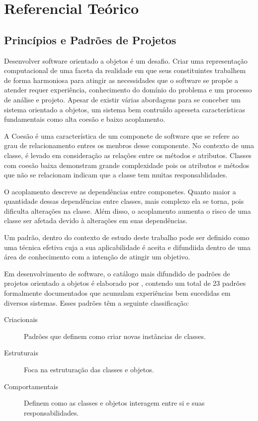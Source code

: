 \chapter{Referencial Teórico}

\section{Princípios e Padrões de Projetos}


Desenvolver software orientado a objetos é um desafio. Criar uma representação
computacional de uma faceta da realidade em que seus constituintes trabalhem de
forma harmoniosa para atingir as necessidades que o software se propõe a
atender requer experiência, conhecimento do domínio do problema e um processo de
análise e projeto. Apesar de existir várias abordagens para se conceber um
sistema orientado a objetos\cite{evans2004ddd},\cite{gomma11} um sistema bem
contruído apreseta características fundamentais como alta coesão e
baixo acoplamento.

A Coesão é uma característica de um componete de software que se refere ao grau
de relacionamento entres os menbros desse componente. No contexto de uma classe,
é levado em consideração as relações entre os métodos e atributos. Classes com
coesão baixa demonstram grande complexidade pois os atributos e métodos que não
se relacionam indicam que a classe tem muitas responsablidades.

O acoplamento descreve as dependências entre componetes. Quanto maior a
quantidade dessas dependências entre classes, mais complexo ela se torna, pois
dificulta  alterações na classe. Além disso, o acoplamento aumenta o risco de
uma classe ser afetada devido à alterações em suas dependências.

Um padrão, dentro do contexto de estudo deste trabalho pode ser definido
como uma técnica efetiva cuja a sua aplicabilidade é aceita e difundiida dentro
de uma área de conhecimento com a intenção de atingir um
objetivo\cite{MetskerWake06}.

Em desenvolvimento de software, o catálogo mais difundido de padrões de projetos
orientado a objetos é elaborado por , contendo um total de 23
padrões formalmente documentados que acumulam experiências bem sucedidas em
diversos sistemas. Esses padrões têm a seguinte classificação:

\begin{description}
\item[Criacionais] Padrões que definem como criar novas instâncias de classes.
\item[Estruturais] Foca na estruturação das classes e objetos.
\item[Comportamentais] Definem como as classes e objetos interagem entre si e
suas responsabilidades.
\end{description}

